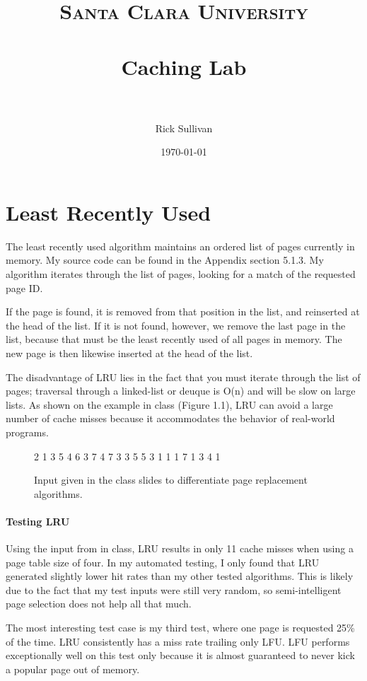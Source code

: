 \documentclass[paper=a4, fontsize=11pt]{scrartcl} %
\title{ 
\normalfont \normalsize 
\textsc{Santa Clara University} \\ [25pt] %
\horrule{0.5pt} \\[0.4cm] %
\huge Caching Lab\\ %
\horrule{2pt} \\[0.5cm] %
}
\author{Rick Sullivan} %
\date{\normalsize\today} %
\numberwithin{equation}{section} %
\numberwithin{figure}{section} %
\numberwithin{table}{section} %
\begin{document}
\maketitle %


\section{Least Recently Used}
The least recently used algorithm maintains an ordered list of pages currently in memory. My source code can be found in the Appendix section 5.1.3. My algorithm iterates through the list of pages, looking for a match of the requested page ID. 

If the page is found, it is removed from that position in the list, and reinserted at the head of the list. If it is not found, however, we remove the last page in the list, because that must be the least recently used of all pages in memory. The new page is then likewise inserted at the head of the list.

The disadvantage of LRU lies in the fact that you must iterate through the list of pages; traversal through a linked-list or deuque is O(n) and will be slow on large lists. As shown on the example in class (Figure 1.1), LRU can avoid a large number of cache misses because it accommodates the behavior of real-world programs. 

\begin{figure}
     2 1 3 5 4 6 3 7 4 7 3 3 5 5 3 1 1 1 7 1 3 4 1 
\caption{Input given in the class slides to differentiate page replacement algorithms.}
\end{figure}

\paragraph{Testing LRU}
Using the input from in class, LRU results in only 11 cache misses when using a page table size of four. In my automated testing, I only found that LRU generated slightly lower hit rates than my other tested algorithms. This is likely due to the fact that my test inputs were still very random, so semi-intelligent page selection does not help all that much.

The most interesting test case is my third test, where one page is requested 25\% of the time. LRU consistently has a miss rate trailing only LFU. LFU performs exceptionally well on this test only because it is almost guaranteed to never kick a popular page out of memory.
\end{document}
